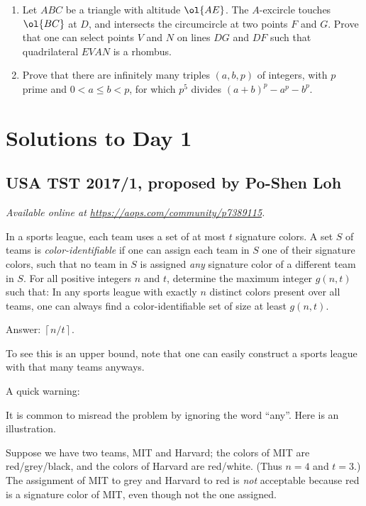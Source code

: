 \documentclass[11pt]{scrartcl}
\begin{document}
\begin{enumerate}[\bfseries 1.]
\item %
Let $ABC$ be a triangle with altitude $\ol{AE}$.
The $A$-excircle touches $\ol{BC}$ at $D$,
and intersects the circumcircle at two points $F$ and $G$.
Prove that one can select points $V$ and $N$
on lines $DG$ and $DF$ such that quadrilateral $EVAN$ is a rhombus.

\item %
Prove that there are infinitely many triples $(a,b,p)$ of integers,
with $p$ prime and $0 < a \le b < p$,
for which $p^5$ divides $(a+b)^p - a^p - b^p$.

\end{enumerate}
\pagebreak

\section{Solutions to Day 1}
\subsection{USA TST 2017/1, proposed by Po-Shen Loh}
\textsl{Available online at \url{https://aops.com/community/p7389115}.}
\begin{mdframed}[style=mdpurplebox,frametitle={Problem statement}]
In a sports league, each team uses a set of at most $t$ signature colors.
A set $S$ of teams is \emph{color-identifiable} if one can assign
each team in $S$ one of their signature colors,
such that no team in $S$ is assigned
\emph{any} signature color of a different team in $S$.
For all positive integers $n$ and $t$,
determine the maximum integer $g(n,t)$ such that:
In any sports league with exactly $n$ distinct colors
present over all teams, one can always
find a color-identifiable set of size at least $g(n,t)$.
\end{mdframed}
Answer: $\left\lceil n/t \right\rceil$.

To see this is an upper bound, note that one can easily construct
a sports league with that many teams anyways.

A quick warning:
\begin{remark*}
  It is common to misread the problem by ignoring the word ``any''.
  Here is an illustration.

  Suppose we have two teams, MIT and Harvard;
  the colors of MIT are red/grey/black, and
  the colors of Harvard are red/white.
  (Thus $n=4$ and $t=3$.)
  The assignment of MIT to grey and Harvard to red
  is \emph{not} acceptable because red is a
  signature color of MIT, even though not the one assigned.
\end{remark*}
\end{document}
